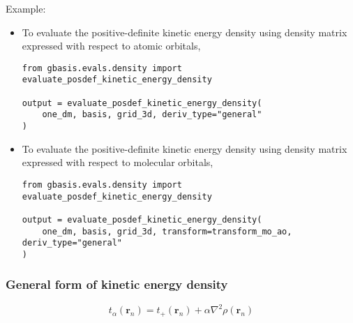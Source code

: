 \documentclass[letterpaper]{article}
\begin{document}
Example:
\begin{itemize}
\item To evaluate the positive-definite kinetic energy density using density
  matrix expressed with respect to atomic orbitals,
  \begin{lstlisting}[xleftmargin=-25pt]
from gbasis.evals.density import evaluate_posdef_kinetic_energy_density

output = evaluate_posdef_kinetic_energy_density(
	one_dm, basis, grid_3d, deriv_type="general"
)
\end{lstlisting}
\item To evaluate the positive-definite kinetic energy density using density
  matrix expressed with respect to molecular orbitals,
  \begin{lstlisting}[xleftmargin=-25pt]
from gbasis.evals.density import evaluate_posdef_kinetic_energy_density

output = evaluate_posdef_kinetic_energy_density(
    one_dm, basis, grid_3d, transform=transform_mo_ao, deriv_type="general"
)
\end{lstlisting}
\end{itemize}
\subsubsection{General form of kinetic energy density}
\begin{equation}
  t_{\alpha} (\mathbf{r}_n) = t_+(\mathbf{r}_n) + \alpha \nabla^2 \rho(\mathbf{r}_n)
\end{equation}
\end{document}
